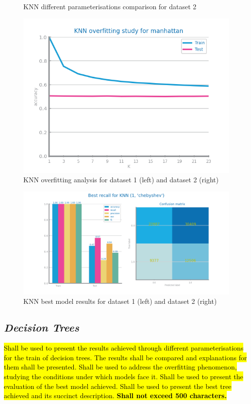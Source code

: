 \documentclass[10pt]{extarticle}
\newcommand{\ctext}[3][RGB]{%
  \begingroup
  \definecolor{hlcolor}{#1}{#2}\sethlcolor{hlcolor}%
  \hl{#3}%
  \endgroup
}
\begin{document}
\begin{figure}[H]
\caption{KNN different parameterisations comparison for dataset 2}
\end{figure}

\begin{figure}[H]
\centering\includegraphics[scale=0.95]{images/dataset1/models_evaluation/CovidPos_knn_overfitting.png}
\caption{KNN overfitting analysis for dataset 1 (left) and dataset 2 (right)}
\end{figure}

\begin{figure}[H]
\centering\includegraphics[scale=0.95]{images/dataset1/models_evaluation/CovidPos_knn_KNN_best_recall_eval.png}
\caption{KNN best model results for dataset 1 (left) and dataset 2 (right)}
\end{figure}

\subsection*{\textit{Decision Trees}}
\ctext[RGB]{190,190,190}{Shall be used to present the results achieved through different parameterisations for the train of decision trees. The results shall be compared and explanations for them shall be presented. Shall be used to address the overfitting phenomenon, studying the conditions under which models face it. Shall be used to present the evaluation of the best model achieved. Shall be used to present the best tree achieved and its succinct description.  \textbf{Shall not exceed 500 characters.}}
\end{document}
